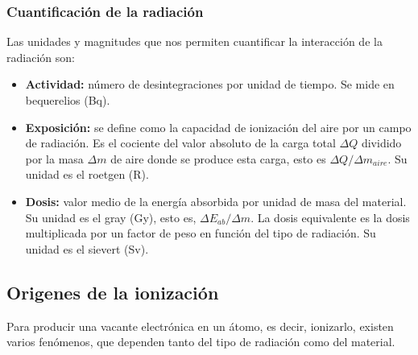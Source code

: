 \subsubsection{Cuantificación de la radiación}

Las unidades y magnitudes que nos permiten cuantificar la interacción de la radiación son: 

\begin{itemize}
    \item \textbf{Actividad:} número de desintegraciones por unidad de tiempo. Se mide en bequerelios (Bq).
    \item \textbf{Exposición:} se define como la capacidad de ionización del aire por un campo de radiación. Es el cociente del valor absoluto de la carga total $\Delta Q$ dividido por la masa $\Delta m$ de aire donde se produce esta carga, esto es $\Delta Q/\Delta m_{aire}$. Su unidad es el roetgen (R). 
    \item \textbf{Dosis:} valor medio de la energía absorbida por unidad de masa del material. Su unidad es el gray (Gy), esto es, $\Delta E_{ab}/\Delta m$. La dosis equivalente es la dosis multiplicada por un factor de peso en función del tipo de radiación. Su unidad es el sievert (Sv).
\end{itemize}

\subsection{Origenes de la ionización}

Para producir una vacante electrónica en un átomo, es decir, ionizarlo, existen varios fenómenos, que dependen tanto del tipo de radiación como del material. 

